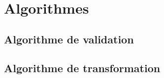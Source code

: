 \section{Algorithmes}

\subsection{Algorithme de validation}

\subsection{Algorithme de transformation}